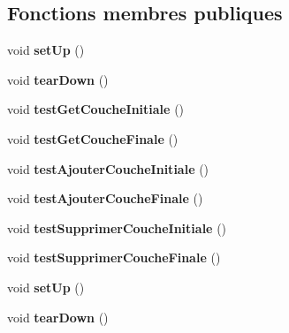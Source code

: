 \subsection*{Fonctions membres publiques}
\begin{DoxyCompactItemize}
\item 
\mbox{\label{classTestReseauNeurones_a96258fba3363e463ae230849f4e3c236}} 
void {\bfseries set\+Up} ()
\item 
\mbox{\label{classTestReseauNeurones_ae52666ac7cb0176354c7d3b4306deec0}} 
void {\bfseries tear\+Down} ()
\item 
\mbox{\label{classTestReseauNeurones_aaf72a0dbcbb46dbdbfb36fe61514d59d}} 
void {\bfseries test\+Get\+Couche\+Initiale} ()
\item 
\mbox{\label{classTestReseauNeurones_a9808a8c9c28f167845db1e6f57435bb3}} 
void {\bfseries test\+Get\+Couche\+Finale} ()
\item 
\mbox{\label{classTestReseauNeurones_a2aa4cdb205ead6f6275db97894c1be09}} 
void {\bfseries test\+Ajouter\+Couche\+Initiale} ()
\item 
\mbox{\label{classTestReseauNeurones_a2cc008d42aff3d270ae3e1f935fbf6b8}} 
void {\bfseries test\+Ajouter\+Couche\+Finale} ()
\item 
\mbox{\label{classTestReseauNeurones_a289a476c4f62458cb9ded841ea1b4148}} 
void {\bfseries test\+Supprimer\+Couche\+Initiale} ()
\item 
\mbox{\label{classTestReseauNeurones_a0e733607d7e5bbd48a3d6e5b62d5991f}} 
void {\bfseries test\+Supprimer\+Couche\+Finale} ()
\item 
\mbox{\label{classTestReseauNeurones_a96258fba3363e463ae230849f4e3c236}} 
void {\bfseries set\+Up} ()
\item 
\mbox{\label{classTestReseauNeurones_ae52666ac7cb0176354c7d3b4306deec0}} 
void {\bfseries tear\+Down} ()

\end{DoxyCompactItemize}
